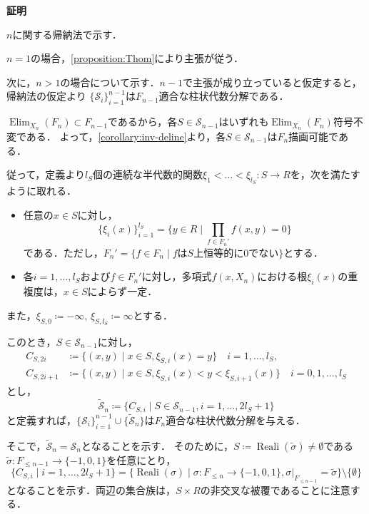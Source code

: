 \documentclass[uplatex, dvipdfmx]{jsarticle}
\makeatletter
\numberwithin{equation}{section}
\renewenvironment{proof}[1][\proofname]{\par
  \pushQED{\qed}%
  \normalfont \topsep6\p@\@plus6\p@\relax
  \trivlist
  \item\relax
  {\bfseries
  #1\@addpunct{.}}\hspace\labelsep\ignorespaces
}{
  \popQED\endtrivlist\@endpefalse
}
\newcommand{\calS}{\mathcal{S}}
\newcommand{\map}[3]{{#1}\colon{#2}\rightarrow{#3}}
\DeclareMathOperator{\Elim}{Elim}
\DeclareMathOperator{\Reali}{Reali}
\theoremstyle{definition}
\renewcommand{\proofname}{\textbf{証明}}
\makeatother
\begin{document}
\begin{proof}
     $n$に関する帰納法で示す．

     $n=1$の場合，\cref{proposition:Thom}により主張が従う．

     次に，$n>1$の場合について示す．$n-1$で主張が成り立っていると仮定すると，帰納法の仮定より
     $\{\calS_{i}\}_{i=1}^{n-1}$は$F_{n-1}$適合な柱状代数分解である．

     $\Elim_{X_n}(F_n) \subset F_{n-1}$であるから，各$S \in \calS_{n-1}$はいずれも$\Elim_{X_n}(F_n)$符号不変である．
     よって，\cref{corollary:inv-deline}より，各$S \in \calS_{n-1}$は$F_n$描画可能である．

     従って，定義より$l_S$個の連続な半代数的関数$\map{\xi_1<\dots<\xi_{l_S}}{S}{R}$を，次を満たすように取れる．
     \begin{itemize}
          \item 任意の$ x \in S $に対し，
          \begin{equation}
               \{\xi_i(x)\}_{i=1}^{l_S} = \{y \in R \mid \prod_{f \in F_n'}f(x,y)=0\}
          \end{equation}
          である．ただし，$F_n' = \{f \in F_n \mid \text{$f$は$S$上恒等的に$0$でない}\}$とする．
          \item 各$i=1, \dots, l_S$および$f \in F_n'$に対し，多項式$f(x,X_n)$における根$\xi_i(x)$の重複度は，$x\in S$によらず一定．
     \end{itemize}
     また，$\xi_{S,0} \coloneqq -\infty$, $\xi_{S,l_S} \coloneqq \infty$とする．

     このとき，$S \in \calS_{n-1}$に対し，
     \begin{align}
          C_{S,2i} &\coloneqq \{(x,y) \mid  x \in S, \xi_{S,i}(x) = y \} \quad i = 1,\dots, l_S,\\
          C_{S,2i+1} &\coloneqq \{(x,y) \mid x \in S, \xi_{S,i}(x)<y<\xi_{S,i+1}(x) \} \quad i = 0,1, \dots, l_S 
     \end{align}
     とし，
     \begin{equation}
          \widetilde{\calS}_n \coloneqq \{C_{S,i} \mid S \in \calS_{n-1}, i=1, \dots, 2l_S+1 \}
     \end{equation}
     と定義すれば，$\{\calS_i\}_{i=1}^{n-1} \cup \{\widetilde{\calS}_n\}$は$F_n$適合な柱状代数分解を与える．

     そこで，$\widetilde{\calS}_n = \calS_n$となることを示す．
     そのために，$S\coloneqq \Reali(\widetilde{\sigma}) \neq \emptyset$である$\map{\widetilde{\sigma}}{F_{\leq n-1}}{\{-1,0,1\}}$を任意にとり，
     \begin{equation}
          \{C_{S,i} \mid i=1, \dots, 2l_S + 1\} = \{\Reali(\sigma) \mid \map{\sigma}{F_{\leq n}}{\{-1,0,1\}}, \sigma|_{F_{\leq n-1}} = \widetilde{\sigma}\} \setminus \{\emptyset\}
     \end{equation}
     となることを示す．両辺の集合族は，$S \times R$の非交叉な被覆であることに注意する．


\end{proof}
\end{document}
